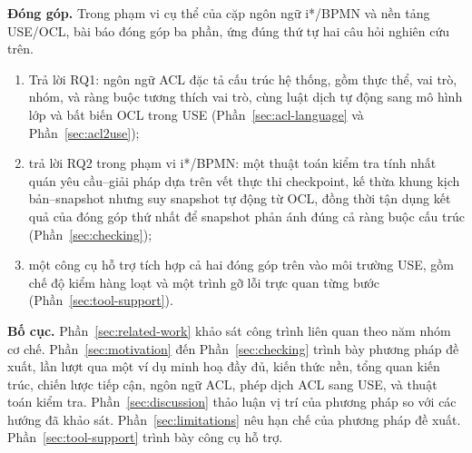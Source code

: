 \textbf{Đóng góp.} Trong phạm vi cụ thể của cặp ngôn ngữ i*/BPMN và nền tảng USE/OCL, bài báo đóng
góp ba phần, ứng đúng thứ tự hai câu hỏi nghiên cứu trên.
\begin{enumerate}
  \item Trả lời RQ1: ngôn ngữ ACL đặc tả cấu trúc hệ thống, gồm thực thể, vai trò, nhóm, và ràng
    buộc tương thích vai trò, cùng luật dịch tự động sang mô hình lớp và bất biến OCL trong USE
    (Phần~\ref{sec:acl-language} và Phần~\ref{sec:acl2use});
  \item trả lời RQ2 trong phạm vi i*/BPMN: một thuật toán kiểm tra tính nhất quán yêu cầu--giải
    pháp dựa trên vết thực thi checkpoint, kế thừa khung kịch bản--snapshot nhưng suy snapshot tự
    động từ OCL, đồng thời tận dụng kết quả của đóng góp thứ nhất để snapshot phản ánh đúng cả
    ràng buộc cấu trúc (Phần~\ref{sec:checking});
  \item một công cụ hỗ trợ tích hợp cả hai đóng góp trên vào môi trường USE, gồm chế độ kiểm hàng
    loạt và một trình gỡ lỗi trực quan từng bước (Phần~\ref{sec:tool-support}).
\end{enumerate}

\textbf{Bố cục.} Phần~\ref{sec:related-work} khảo sát công trình liên quan theo năm nhóm cơ chế.
Phần~\ref{sec:motivation} đến Phần~\ref{sec:checking} trình bày phương pháp đề xuất, lần lượt qua
một ví dụ minh hoạ đầy đủ, kiến thức nền, tổng quan kiến trúc, chiến lược tiếp cận, ngôn ngữ ACL,
phép dịch ACL sang USE, và thuật toán kiểm tra. Phần~\ref{sec:discussion} thảo luận vị trí của
phương pháp so với các hướng đã khảo sát. Phần~\ref{sec:limitations} nêu hạn chế của phương pháp
đề xuất. Phần~\ref{sec:tool-support} trình bày công cụ hỗ trợ.
